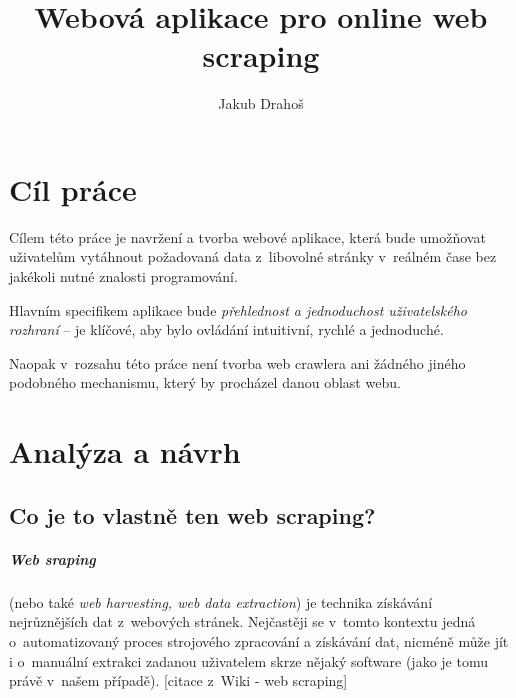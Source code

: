 \documentclass[thesis=B,czech]{FITthesis}[2012/06/26]
\title{Webová aplikace pro online web scraping}
\author{Jakub Drahoš} %
\begin{document}

\begin{introduction}
\end{introduction}





\chapter{Cíl práce}

Cílem této práce je navržení a tvorba webové aplikace, která bude umožňovat uživatelům vytáhnout požadovaná data z~libovolné stránky v~reálném čase bez jakékoli nutné znalosti programování.

Hlavním specifikem aplikace bude \emph{přehlednost a jednoduchost uživatelského rozhraní} -- je klíčové, aby bylo ovládání intuitivní, rychlé a jednoduché.

Naopak v~rozsahu této práce není tvorba web crawlera ani žádného jiného podobného mechanismu, který by procházel danou oblast webu.




\chapter{Analýza a návrh}


\section{Co je to vlastně ten web scraping?}
\paragraph{Web sraping}
(nebo také \emph{web harvesting, web data extraction}) je technika získávání nejrůznějších dat z~webových stránek. Nejčastěji se v~tomto kontextu jedná o~automatizovaný proces strojového zpracování a získávání dat, nicméně může jít i o~manuální extrakci zadanou uživatelem skrze nějaký software (jako je tomu právě v~našem případě). [citace z~Wiki - web scraping]
\end{document}
